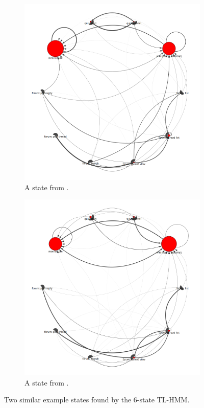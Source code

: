 \begin{figure}
  \centering
  \begin{subfigure}[t]{0.5\textwidth}
    \includegraphics[width=\textwidth]{figures/text-6state/state4.png}
    \caption{A state from \textretrieval{}.}
  \end{subfigure}%
  \begin{subfigure}[t]{0.5\textwidth}
    \includegraphics[width=\textwidth]{figures/sustain-6state/state4.png}
    \caption{A state from \sustain{}.}
  \end{subfigure}
  \caption{Two similar example states found by the 6-state TL-HMM.}
  \label{fig:cross-course}
\end{figure}

